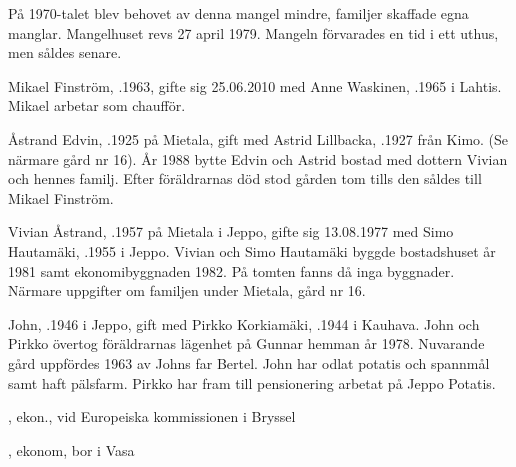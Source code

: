 På 1970-talet blev behovet av denna mangel mindre, familjer skaffade egna manglar. Mangelhuset revs 27 april 1979. Mangeln förvarades en tid i ett uthus, men såldes senare.



%



%
Mikael Finström, .1963, gifte sig 25.06.2010 med Anne Waskinen, .1965 i Lahtis. Mikael arbetar som chaufför.\jhvspace{}


%
Åstrand Edvin, .1925 på Mietala, gift med Astrid Lillbacka, .1927 från Kimo. (Se närmare gård nr 16). År 1988 bytte Edvin och Astrid bostad med dottern Vivian och hennes familj. Efter föräldrarnas död stod gården tom tills den såldes till Mikael Finström.


%
Vivian Åstrand, .1957  på Mietala i Jeppo, gifte sig 13.08.1977 med Simo Hautamäki, .1955 i Jeppo. Vivian och Simo Hautamäki byggde bostadshuset år 1981 samt ekonomibyggnaden 1982. På tomten fanns då inga byggnader. Närmare uppgifter om familjen under Mietala, gård nr 16.



%



%
John, .1946 i Jeppo, gift med Pirkko Korkiamäki, .1944 i Kauhava. John och Pirkko övertog föräldrarnas lägenhet på Gunnar hemman år 1978. Nuvarande gård uppfördes 1963 av Johns far Bertel. John har odlat potatis och spannmål samt haft pälsfarm. Pirkko har fram till pensionering arbetat på Jeppo Potatis.
\begin{jhchildren}
  \item {}, ekon., vid Europeiska kommissionen i Bryssel
  \item {}, ekonom, bor i Vasa
\end{jhchildren}


